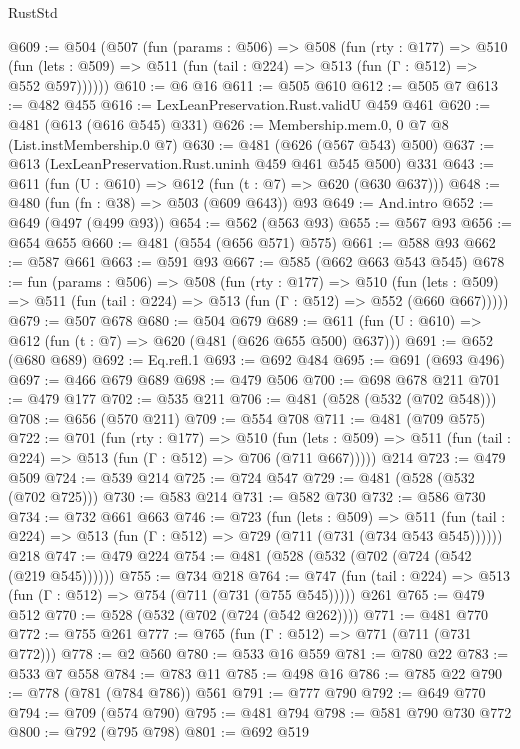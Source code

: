 \begin{lexlean}{RustStd}
\begin{coremodule}
@609 := @504
    (@507
      (fun (params : @506) =>
      @508
        (fun (rty : @177) =>
        @510
          (fun (lets : @509) => @511 (fun (tail : @224) => @513 (fun (Γ : @512) => @552 @597))))))
@610 := @6 @16
@611 := @505 @610
@612 := @505 @7
@613 := @482 @455
@616 := LexLeanPreservation.Rust.validU @459 @461
@620 := @481 (@613 (@616 @545) @331)
@626 := Membership.mem.{0, 0} @7 @8 (List.instMembership.{0} @7)
@630 := @481 (@626 (@567 @543) @500)
@637 := @613 (LexLeanPreservation.Rust.uninh @459 @461 @545 @500) @331
@643 := @611 (fun (U : @610) => @612 (fun (t : @7) => @620 (@630 @637)))
@648 := @480 (fun (fn : @38) => @503 (@609 @643)) @93
@649 := And.intro
@652 := @649 (@497 (@499 @93))
@654 := @562 (@563 @93)
@655 := @567 @93
@656 := @654 @655
@660 := @481 (@554 (@656 @571) @575)
@661 := @588 @93
@662 := @587 @661
@663 := @591 @93
@667 := @585 (@662 @663 @543 @545)
@678 := fun (params : @506) =>
  @508
    (fun (rty : @177) =>
    @510
      (fun (lets : @509) => @511 (fun (tail : @224) => @513 (fun (Γ : @512) => @552 (@660 @667)))))
@679 := @507 @678
@680 := @504 @679
@689 := @611 (fun (U : @610) => @612 (fun (t : @7) => @620 (@481 (@626 @655 @500) @637)))
@691 := @652 (@680 @689)
@692 := Eq.refl.{1}
@693 := @692 @484
@695 := @691 (@693 @496)
@697 := @466 @679 @689
@698 := @479 @506
@700 := @698 @678 @211
@701 := @479 @177
@702 := @535 @211
@706 := @481 (@528 (@532 (@702 @548)))
@708 := @656 (@570 @211)
@709 := @554 @708
@711 := @481 (@709 @575)
@722 := @701
    (fun (rty : @177) =>
    @510
      (fun (lets : @509) => @511 (fun (tail : @224) => @513 (fun (Γ : @512) => @706 (@711 @667)))))
    @214
@723 := @479 @509
@724 := @539 @214
@725 := @724 @547
@729 := @481 (@528 (@532 (@702 @725)))
@730 := @583 @214
@731 := @582 @730
@732 := @586 @730
@734 := @732 @661 @663
@746 := @723
    (fun (lets : @509) =>
    @511 (fun (tail : @224) => @513 (fun (Γ : @512) => @729 (@711 (@731 (@734 @543 @545))))))
    @218
@747 := @479 @224
@754 := @481 (@528 (@532 (@702 (@724 (@542 (@219 @545))))))
@755 := @734 @218
@764 := @747 (fun (tail : @224) => @513 (fun (Γ : @512) => @754 (@711 (@731 (@755 @545))))) @261
@765 := @479 @512
@770 := @528 (@532 (@702 (@724 (@542 @262))))
@771 := @481 @770
@772 := @755 @261
@777 := @765 (fun (Γ : @512) => @771 (@711 (@731 @772)))
@778 := @2 @560
@780 := @533 @16 @559
@781 := @780 @22
@783 := @533 @7 @558
@784 := @783 @11
@785 := @498 @16
@786 := @785 @22
@790 := @778 (@781 (@784 @786)) @561
@791 := @777 @790
@792 := @649 @770
@794 := @709 (@574 @790)
@795 := @481 @794
@798 := @581 @790 @730 @772
@800 := @792 (@795 @798)
@801 := @692 @519

\end{coremodule}
\end{lexlean}
